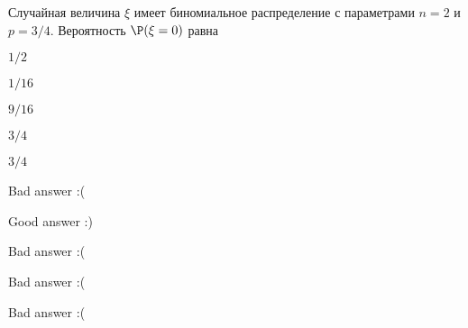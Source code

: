 
\begin{question}
Случайная величина \(\xi\) имеет биномиальное распределение с
параметрами \(n = 2\) и \(p = 3/4\). Вероятность \(\P(\xi = 0)\) равна
\begin{answerlist}
  \item \(1/2\)
  \item \(1/16\)
  \item \(9/16\)
  \item \(3/4\)
  \item \(3/4\)
\end{answerlist}
\end{question}

\begin{solution}
\begin{answerlist}
  \item Bad answer :(
  \item Good answer :)
  \item Bad answer :(
  \item Bad answer :(
  \item Bad answer :(
\end{answerlist}
\end{solution}


